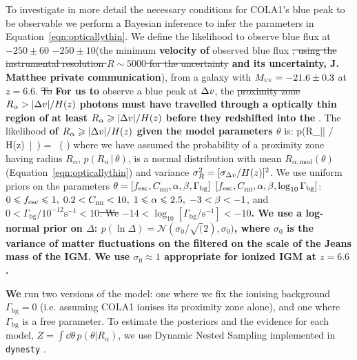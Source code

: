 \documentclass[fleqn,usenatbib]{mnras}
\providecommand{\DIFadd}[1]{{\protect\color{Green} {\bf #1}}} %
\providecommand{\DIFdel}[1]{{\protect\color{Gray} \scriptsize \sout{#1}}} %
\providecommand{\DIFaddbegin}{} %
\providecommand{\DIFaddend}{} %
\providecommand{\DIFdelbegin}{} %
\providecommand{\DIFdelend}{} %
\newcommand{\DIFscaledelfig}{0.5}
\newlength{\DIFdelgraphicswidth} %
\newlength{\DIFdelgraphicsheight} %
\newcommand{\DIFaddincludegraphics}[2][]{{\color{purple}\fbox{\DIFOincludegraphics[#1]{#2}}}} %
\newcommand{\DIFdelincludegraphics}[2][]{%
\sbox{\DIFdelgraphicsbox}{\DIFOincludegraphics[#1]{#2}}%
\settoboxwidth{\DIFdelgraphicswidth}{\DIFdelgraphicsbox} %
\settoboxtotalheight{\DIFdelgraphicsheight}{\DIFdelgraphicsbox} %
\scalebox{\DIFscaledelfig}{%
\parbox[b]{\DIFdelgraphicswidth}{\usebox{\DIFdelgraphicsbox}\\[-\baselineskip] \rule{\DIFdelgraphicswidth}{0em}}\llap{\resizebox{\DIFdelgraphicswidth}{\DIFdelgraphicsheight}{%
\setlength{\unitlength}{\DIFdelgraphicswidth}%
\begin{picture}(1,1)%
\thicklines\linethickness{2pt} %
{\color[rgb]{1,0,0}\put(0,0){\framebox(1,1){}}}%
{\color[rgb]{1,0,0}\put(0,0){\line( 1,1){1}}}%
{\color[rgb]{1,0,0}\put(0,1){\line(1,-1){1}}}%
\end{picture}%
}\hspace*{3pt}}} %
} %
\DeclareRobustCommand{\DIFaddbegin}{\DIFOaddbegin \let\includegraphics\DIFaddincludegraphics} %
\DeclareRobustCommand{\DIFaddend}{\DIFOaddend \let\includegraphics\DIFOincludegraphics} %
\DeclareRobustCommand{\DIFdelbegin}{\DIFOdelbegin \let\includegraphics\DIFdelincludegraphics} %
\DeclareRobustCommand{\DIFdelend}{\DIFOaddend \let\includegraphics\DIFOincludegraphics} %
\begin{document}
To investigate in more detail the necessary conditions for COLA1's blue peak to be observable we perform a Bayesian inference to infer the parameters in Equation~\eqref{eqn:opticallythin}. We define the likelihood to observe blue \lya flux at \DIFdelbegin \DIFdel{$-250\pm60$}\DIFdelend \DIFaddbegin \DIFadd{$-250\pm10$}\DIFaddend \kms (the minimum \DIFaddbegin \DIFadd{velocity of }\DIFaddend observed blue flux \DIFdelbegin \DIFdel{, using the instrumental resolution $R\sim5000$ for the uncertainty}\DIFdelend \DIFaddbegin \DIFadd{and its uncertainty, J. Matthee private communication}\DIFaddend ), from a galaxy with $\MUV = -21.6\pm0.3$ at $z=6.6$. \DIFdelbegin \DIFdel{To }\DIFdelend \DIFaddbegin \DIFadd{For us to }\DIFaddend observe a blue peak at $\DV$, the \DIFdelbegin \DIFdel{proximity zone $R_\alpha > |\DV| / H(z)$}\DIFdelend \DIFaddbegin \DIFadd{photons must have travelled through a optically thin region of at least $R_\alpha \geq |\DV| / H(z)$ before they redshifted into the }\lya\DIFadd{\ resonant frequency}\DIFaddend . The likelihood \DIFaddbegin \DIFadd{of $R_\alpha \geq |\DV| / H(z)$ given the model parameters $\theta$ }\DIFaddend is:
%
\BE \label{eqn:like}
p(R_\alpha \geq |\DV| / H(z) \,|\, \theta) =  \, \left( \right)
\EE
%
where we have assumed the probability of a proximity zone having radius $R_\alpha$, $p(R_\alpha \,|\, \theta)$, is a normal distribution with mean $R_{\alpha,\mathrm{mod}}(\theta)$ (Equation~\ref{eqn:opticallythin}) and variance $\sigma_R^2 = [\sigma_{\DV}/H(z)]^2$. We use uniform priors on the parameters \DIFdelbegin \DIFdel{$\theta = [\fesc, \clump, \alpha, \beta, \Gamma_\mathrm{bg}]$}\DIFdelend \DIFaddbegin \DIFadd{$[\fesc, \clump, \alpha, \beta, \log_{10}\Gamma_\mathrm{bg}]$}\DIFaddend : $0 \leq \fesc \leq 1, \; 0.2 < \clump < 10, \; 1 \leq \alpha \leq 2.5, \;-3 < \beta < -1$, and \DIFdelbegin \DIFdel{$0 < \Gamma_\mathrm{bg}/10^{-12}\mathrm{s}^{-1} < 10$. We }\DIFdelend \DIFaddbegin \DIFadd{$-14 < \log_{10}[\Gamma_\mathrm{bg}/\mathrm{s}^{-1}] <-10$. We use a log-normal prior on $\Delta$: $p(\ln{\Delta}) = \mathcal{N}(\sigma_0/\sqrt(2), \sigma_0)$, where $\sigma_0$ is the variance of matter fluctuations on the filtered on the scale of the Jeans mass of the IGM. We use $\sigma_0 \approx 1$ appropriate for ionized IGM at $z=6.6$ }\citep[e.g.,][]{Bi1997,Bi2003}\DIFadd{.
}

\DIFadd{We }\DIFaddend run two versions of the model: one where we fix the ionising background $\Gamma_\mathrm{bg} = 0$ (i.e. assuming COLA1 ionises its proximity zone alone), and one where $\Gamma_\mathrm{bg}$ is a free parameter. To estimate the posteriors and the evidence for each model, $Z = \int \dd \theta \, p(\theta | R_\alpha)$, we use Dynamic Nested Sampling implemented in \verb|dynesty| \citep{Speagle2019}.
\end{document}
